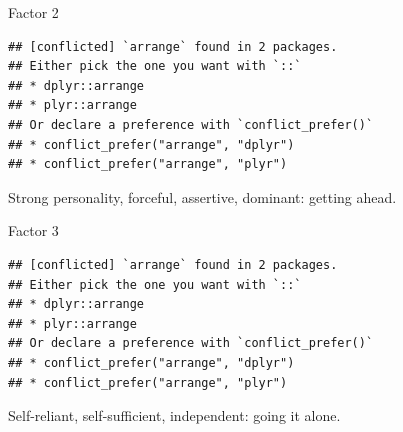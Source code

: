 \documentclass[ignorenonframetext,]{beamer}
\newenvironment{Shaded}{\begin{snugshade}}{\end{snugshade}}
\newcommand{\DecValTok}[1]{\textcolor[rgb]{0.00,0.00,0.81}{#1}}
\newcommand{\KeywordTok}[1]{\textcolor[rgb]{0.13,0.29,0.53}{\textbf{#1}}}
\newcommand{\NormalTok}[1]{#1}
\newcommand{\OperatorTok}[1]{\textcolor[rgb]{0.81,0.36,0.00}{\textbf{#1}}}
\newcommand{\StringTok}[1]{\textcolor[rgb]{0.31,0.60,0.02}{#1}}
\begin{document}
\begin{frame}[fragile]{Factor 2}
\protect\hypertarget{factor-2}{}

\begin{Shaded}
\end{Shaded}

\begin{verbatim}
## [conflicted] `arrange` found in 2 packages.
## Either pick the one you want with `::` 
## * dplyr::arrange
## * plyr::arrange
## Or declare a preference with `conflict_prefer()`
## * conflict_prefer("arrange", "dplyr")
## * conflict_prefer("arrange", "plyr")
\end{verbatim}

Strong personality, forceful, assertive, dominant: getting ahead.

\end{frame}

\begin{frame}[fragile]{Factor 3}
\protect\hypertarget{factor-3}{}

\begin{Shaded}
\end{Shaded}

\begin{verbatim}
## [conflicted] `arrange` found in 2 packages.
## Either pick the one you want with `::` 
## * dplyr::arrange
## * plyr::arrange
## Or declare a preference with `conflict_prefer()`
## * conflict_prefer("arrange", "dplyr")
## * conflict_prefer("arrange", "plyr")
\end{verbatim}

Self-reliant, self-sufficient, independent: going it alone.

\end{frame}
\end{document}
